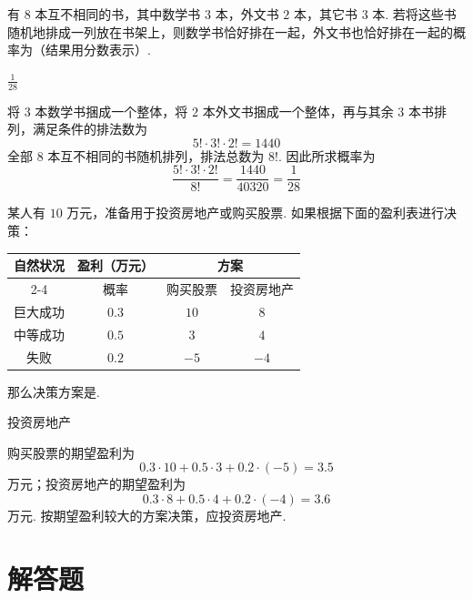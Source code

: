 \begin{problem}[B]
有 \(8\) 本互不相同的书，其中数学书 \(3\) 本，外文书 \(2\) 本，其它书 \(3\) 本. 若将这些书随机地排成一列放在书架上，则数学书恰好排在一起，外文书也恰好排在一起的概率为\fillinblank{}（结果用分数表示）.
\end{problem}

\begin{answer}
\(\frac{1}{28}\)
\end{answer}

\begin{solution}
将 \(3\) 本数学书捆成一个整体，将 \(2\) 本外文书捆成一个整体，再与其余 \(3\) 本书排列，满足条件的排法数为
\[
5!\cdot3!\cdot2!=1440
\]
全部 \(8\) 本互不相同的书随机排列，排法总数为 \(8!\). 因此所求概率为
\[
\frac{5!\cdot3!\cdot2!}{8!}
=\frac{1440}{40320}
=\frac{1}{28}
\]
\end{solution}

\begin{problem}[B]
某人有 \(10\) 万元，准备用于投资房地产或购买股票. 如果根据下面的盈利表进行决策：

\begin{center}
\begin{tabular}{|c|c|c|c|}
\hline
\multirow{2}{*}{自然状况} & 盈利（万元） & \multicolumn{2}{c|}{方案} \\
\cline{2-4}
 & 概率 & 购买股票 & 投资房地产 \\
\hline
巨大成功 & \(0.3\) & \(10\) & \(8\) \\
\hline
中等成功 & \(0.5\) & \(3\) & \(4\) \\
\hline
失败 & \(0.2\) & \(-5\) & \(-4\) \\
\hline
\end{tabular}
\end{center}

那么决策方案是\fillinblank{}.
\end{problem}

\begin{answer}
投资房地产
\end{answer}

\begin{solution}
购买股票的期望盈利为
\[
0.3\cdot10+0.5\cdot3+0.2\cdot(-5)=3.5
\]
万元；投资房地产的期望盈利为
\[
0.3\cdot8+0.5\cdot4+0.2\cdot(-4)=3.6
\]
万元. 按期望盈利较大的方案决策，应投资房地产.
\end{solution}

\section{解答题}

